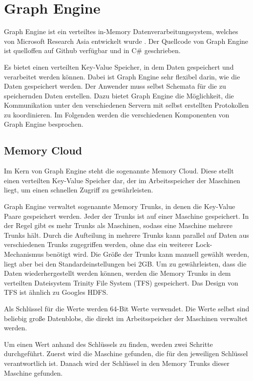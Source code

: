 \section{Graph Engine}

Graph Engine ist ein verteiltes in-Memory Datenverarbeitungssystem, welches von Microsoft Research Asia 
entwickelt wurde \cite{graphEngine}. Der Quellcode von Graph Engine ist quelloffen auf Github verfügbar und in C\# geschrieben.

Es bietet einen verteilten Key-Value Speicher, in dem Daten gespeichert und verarbeitet werden können. Dabei ist Graph Engine sehr flexibel darin, wie die Daten gespeichert werden. Der Anwender muss selbst
Schemata für die zu speichernden Daten erstellen. Dazu bietet Graph Engine die Möglichkeit, die Kommunikation unter den verschiedenen Servern mit selbst erstellten Protokollen zu koordinieren. Im Folgenden werden die verschiedenen Komponenten von Graph Engine besprochen.

\subsection{Memory Cloud}
\label{memoryCloud}

Im Kern von Graph Engine steht die sogenannte Memory Cloud. Diese stellt einen verteilten Key-Value Speicher dar, der im Arbeitsspeicher der Maschinen
liegt, um einen schnellen Zugriff zu gewährleisten.

Graph Engine verwaltet sogenannte Memory Trunks, in denen die Key-Value Paare gespeichert werden. Jeder der Trunks ist auf einer Maschine gespeichert.
In der Regel gibt es mehr Trunks als Maschinen, sodass eine Maschine mehrere Trunks hält. Durch die Aufteilung in mehrere Trunks kann parallel auf Daten aus verschiedenen Trunks zugegriffen
werden, ohne das ein weiterer Lock-Mechanismus benötigt wird. Die Größe der Trunks kann manuell gewählt werden, liegt aber bei den Standardeinstellungen bei 2GB.
Um zu gewährleisten, dass die Daten wiederhergestellt werden können, werden die Memory Trunks in dem verteilten Dateisystem Trinity File System (TFS) gespeichert. Das Design von TFS ist ähnlich zu Googles HDFS.

Als Schlüssel für die Werte werden 64-Bit Werte verwendet.
Die Werte selbst sind beliebig große Datenblobs, die direkt im Arbeitsspeicher der Maschinen verwaltet werden.


Um einen Wert anhand des Schlüssels zu finden, werden zwei Schritte durchgeführt. Zuerst wird die Maschine gefunden, die für den jeweiligen Schlüssel
verantwortlich ist. Danach wird der Schlüssel in den Memory Trunks dieser Maschine gefunden.

